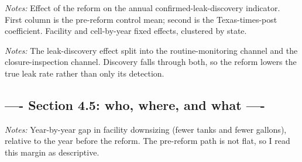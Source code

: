 \documentclass[
  12pt,
]{article}
\begin{document}
\clearpage
\null\vfill
\begin{center}
\label{tbl-leak-did}
\vspace{6pt}

\par\vspace{10pt}
\begin{minipage}{0.85\textwidth}\small\textit{Notes:} Effect of the reform on the annual confirmed-leak-discovery indicator. First column is the pre-reform control mean; second is the Texas-times-post coefficient. Facility and cell-by-year fixed effects, clustered by state.\end{minipage}
\end{center}
\vfill\clearpage

\clearpage
\null\vfill
\begin{center}
\label{tbl-leak-decomp}
\vspace{6pt}

\par\vspace{10pt}
\begin{minipage}{0.85\textwidth}\small\textit{Notes:} The leak-discovery effect split into the routine-monitoring channel and the closure-inspection channel. Discovery falls through both, so the reform lowers the true leak rate rather than only its detection.\end{minipage}
\end{center}
\vfill\clearpage

\subsection{---- Section 4.5: who, where, and what
----}\label{section-4.5-who-where-and-what--}

\clearpage
\null\vfill
\begin{center}
\label{fig-es-downsize}
\par\vspace{8pt}
\par\vspace{8pt}
\begin{minipage}{0.85\textwidth}\small\textit{Notes:} Year-by-year gap in facility downsizing (fewer tanks and fewer gallons), relative to the year before the reform. The pre-reform path is not flat, so I read this margin as descriptive.\end{minipage}
\end{center}
\vfill\clearpage
\end{document}
